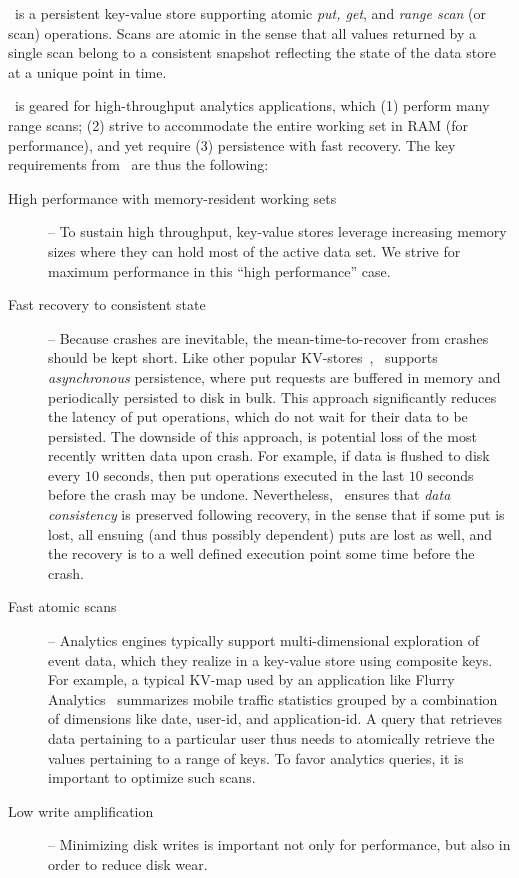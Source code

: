 

\sys\ is a persistent key-value store supporting atomic \emph{put, get}, and  \emph{range scan} (or scan) operations. 
Scans are atomic in the sense that all values returned by a single scan belong to a consistent snapshot reflecting
the state of the data store at a unique point in time.




\sys\ is geared for high-throughput analytics applications, which (1) perform many range scans; 
(2) strive to accommodate the entire working set in RAM (for performance), and yet require  (3)
persistence with fast recovery. 
The key requirements from \sys\ are thus the following:
\begin{description}
\item[High performance with memory-resident working sets] -- 
To sustain high throughput, key-value stores leverage increasing memory sizes where they can hold most of the active data set. 
We strive for maximum performance in this ``high performance'' case.  
\item[Fast recovery to consistent state] --  Because crashes are inevitable, the mean-time-to-recover from crashes should be kept short.
Like other popular KV-stores~\cite{rocksdb,leveldb,hbase}, \sys\ supports \emph{asynchronous} persistence, 
where put requests are buffered in memory and periodically persisted to disk in bulk. 
This approach significantly reduces the latency of put operations, which do not wait for their data to be persisted.
The downside of this approach, is potential loss of the most recently written data upon crash. For example, 
if data is flushed to disk every $10$ seconds, then put operations executed in the last $10$ seconds before the crash 
may be undone. 
Nevertheless, \sys\ ensures that \emph{data consistency} is preserved following recovery, in the sense that 
if some put is lost, all ensuing (and thus possibly dependent) puts are lost as well, and the recovery is to a well 
defined execution point some time before the crash.
 
 \item[Fast atomic scans] -- 
 Analytics engines typically support multi-dimensional exploration of event data, which they realize in a key-value store using composite keys.   For example, a typical  KV-map used by an application like Flurry Analytics~\cite{flurry} 
  summarizes mobile traffic statistics grouped by a combination of dimensions like  date,  user-id, and application-id.
A query that retrieves data pertaining to a particular user thus needs to atomically 
retrieve the values pertaining to a range of keys. 
 To favor analytics queries, it is important to optimize  such scans. 
 \item[Low write amplification] -- Minimizing disk writes is important not only for performance, but also in order to reduce disk wear.


\end{description}
